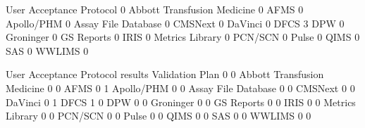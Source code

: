 \documentclass{article}
\begin{document}
\begin{Schunk}
\begin{Soutput}
                              User Acceptance Protocol
                                                     0
  Abbott Transfusion Medicine                        0
  AFMS                                               0
  Apollo/PHM                                         0
  Assay File Database                                0
  CMSNext                                            0
  DaVinci                                            0
  DFCS                                               3
  DPW                                                0
  Groninger                                          0
  GS Reports                                         0
  IRIS                                               0
  Metrics Library                                    0
  PCN/SCN                                            0
  Pulse                                              0
  QIMS                                               0
  SAS                                                0
  WWLIMS                                             0
                             
                              User Acceptance Protocol results Validation Plan
                                                             0               0
  Abbott Transfusion Medicine                                0               0
  AFMS                                                       0               1
  Apollo/PHM                                                 0               0
  Assay File Database                                        0               0
  CMSNext                                                    0               0
  DaVinci                                                    0               1
  DFCS                                                       1               0
  DPW                                                        0               0
  Groninger                                                  0               0
  GS Reports                                                 0               0
  IRIS                                                       0               0
  Metrics Library                                            0               0
  PCN/SCN                                                    0               0
  Pulse                                                      0               0
  QIMS                                                       0               0
  SAS                                                        0               0
  WWLIMS                                                     0               0
\end{Soutput}
\end{Schunk}
\end{document}
